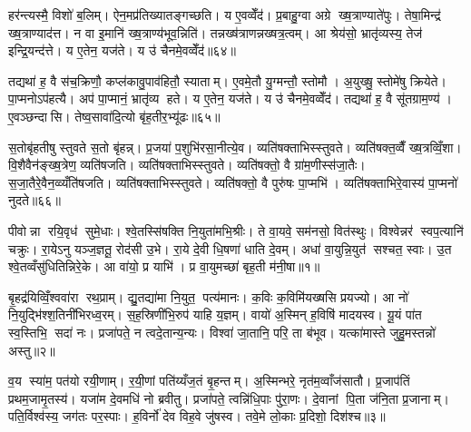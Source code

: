 हर॑न्त्यस्मै॒ विशो॑ ब॒लिम्। ऐन॒मप्र॑तिख्यातङ्गच्छति। य ए॒वव्वेँद॑। प्र॒बाहु॒ग्वा अग्रे ख्ष॒त्राण्याते॑पुः। तेषा॒मिन्द्र॑ ख्ष॒त्राण्याद॑त्त। न वा इ॒मानि॑ ख्ष॒त्राण्य॑भूव॒न्निति॑। तन्नख्ष॑त्राणन्नख्षत्र॒त्वम्। आ श्रेय॑सो॒ भ्रातृ॑व्यस्य॒ तेज॑ इन्द्रि॒यन्द॑त्ते। य ए॒तेन॒ यज॑ते। य उ॑ चैनमे॒वव्वेँद॑॥६४॥

तद्यथा॑ ह॒ वै स॑च॒क्रिणौ॒ कप्ल॑कावु॒पाव॑हितौ॒ स्याताम्। ए॒वमे॒तौ यु॒ग्मन्तौ॒ स्तोमौ। अ॒युख्षु॒ स्तोमे॑षु क्रियेते। पा॒प्मनोऽप॑हत्यै। अप॑ पा॒प्मानं॒ भ्रातृ॑व्य हते। य ए॒तेन॒ यज॑ते। य उ॑ चैनमे॒वव्वेँद॑। तद्यथा॑ ह॒ वै सू॑तग्राम॒ण्य॑। ए॒वञ्छन्दासि। तेष्व॒सावा॑दि॒त्यो बृ॑ह॒तीर॒भ्यू॑ढः॥६५॥

स॒तोबृ॑हतीषु स्तुवते स॒तो बृ॑हन्न्। प्र॒जया॑ प॒शुभि॑रसा॒नीत्ये॒व। व्यति॑षक्ताभिस्स्तुवते। व्यति॑षक्त॒व्वैँ ख्ष॒त्रव्विँ॒शा। वि॒शैवैन॑ङ्ख्ष॒त्रेण॒ व्यति॑षजति। व्यति॑षक्ताभिस्स्तुवते। व्यति॑षक्तो॒ वै ग्रा॑म॒णीस्स॑जा॒तैः। स॒जा॒तैरे॒वैन॒व्व्यँति॑षजति। व्यति॑षक्ताभिस्स्तुवते। व्यति॑षक्तो॒ वै पुरु॑षः पा॒प्मभि॑। व्यति॑षक्ताभिरे॒वास्य॑ पा॒प्मनो॑ नुदते॥६६॥



\clearpage
{}
\setcounter{anuvakam}{0}
पीवोन्ना रयि॒वृध॑ सुमे॒धाः। श्वे॒तस्सि॑षक्ति नि॒युता॑मभि॒श्रीः। ते वा॒यवे॒ सम॑नसो॒ वित॑स्थुः। विश्वेन्नर॑ स्वप॒त्यानि॑ चक्रुः। रा॒येऽनु यञ्ज॒ज्ञतू॒ रोद॑सी उ॒भे। रा॒ये दे॒वी धि॒षणा॑ धाति दे॒वम्। अधा॑ वा॒युन्नि॒युत॑ सश्चत॒ स्वाः। उ॒त श्वे॒तव्वँसु॑धितिन्निरे॒के। आ वा॑यो॒ प्र याभि॑। प्र वा॒युमच्छा॑ बृह॒ती म॑नी॒षा॥१॥

बृ॒हद्र॑यिव्विँ॒श्ववा॑रा रथ॒प्राम्। द्यु॒तद्या॑मा नि॒युत॒ पत्य॑मानः। क॒विः क॒विमि॑यख्षसि प्रयज्यो। आ नो॑ नि॒युद्भि॑श्श॒तिनी॑भिरध्व॒रम्। स॒ह॒स्रिणी॑भि॒रुप॑ याहि य॒ज्ञम्। वायो॑ अ॒स्मिन् ह॒विषि॑ मादयस्व। यू॒यं पा॑त स्व॒स्तिभि॒ सदा॑ नः। प्रजा॑पते॒ न त्वदे॒तान्य॒न्यः। विश्वा॑ जा॒तानि॒ परि॒ ता ब॑भूव। यत्का॑मास्ते जुहु॒मस्तन्नो॑ अस्तु॥२॥

व॒य स्या॑म॒ पत॑यो रयी॒णाम्। र॒यी॒णां पति॑य्यँज॒तं बृ॒हन्तम्। अ॒स्मिन्भरे॒ नृत॑म॒व्वाँज॑सातौ। प्र॒जाप॑तिं प्रथम॒जामृ॒तस्य॑। यजा॑म दे॒वमधि॑ नो ब्रवीतु। प्रजा॑पते॒ त्वन्नि॑धि॒पाः पु॑रा॒णः। दे॒वानां पि॒ता ज॑नि॒ता प्र॒जानाम्। पति॒र्विश्व॑स्य॒ जग॑तः पर॒स्पाः। ह॒विर्नो॑ देव विह॒वे जु॑षस्व। तवे॒मे लो॒काः प्र॒दिशो॒ दिश॑श्च॥३॥


